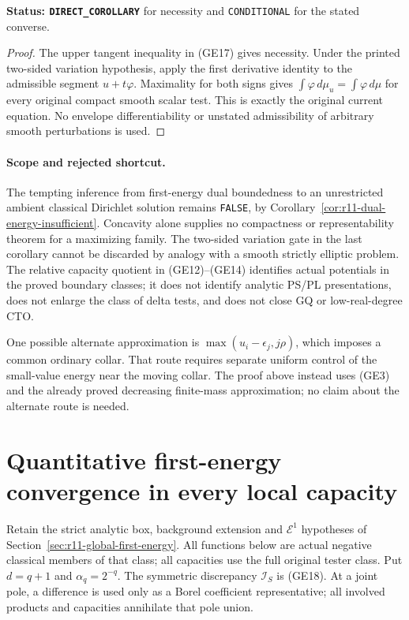 \documentclass[11pt,a4paper]{article}
\numberwithin{equation}{section}
\theoremstyle{definition}
\theoremstyle{remark}
\begin{document}
\noindent\textbf{Status: \texttt{DIRECT\_COROLLARY}} for
necessity and \texttt{CONDITIONAL} for the stated converse.

\begin{proof}
The upper tangent inequality in (GE17) gives necessity.
Under the printed two-sided variation hypothesis, apply
the first derivative identity to the admissible segment
$u+t\varphi$. Maximality for both signs gives
$\int\varphi\,d\mu_u=\int\varphi\,d\mu$ for every
original compact smooth scalar test. This is exactly the
original current equation. No envelope differentiability or
unstated admissibility of arbitrary smooth perturbations is
used.
\end{proof}

\paragraph{Scope and rejected shortcut.}
The tempting inference from first-energy dual boundedness to
an unrestricted ambient classical Dirichlet solution remains
\texttt{FALSE}, by Corollary~\ref{cor:r11-dual-energy-insufficient}.
Concavity alone supplies no compactness or representability
theorem for a maximizing family. The two-sided variation gate
in the last corollary cannot be discarded by analogy with a
smooth strictly elliptic problem. The relative capacity quotient
in (GE12)--(GE14) identifies actual potentials in the proved
boundary classes; it does not identify analytic PS/PL
presentations, does not enlarge the class of delta tests, and
does not close GQ or low-real-degree CTO.

One possible alternate approximation is
$\max(u_i-\epsilon_j,j\rho)$, which imposes a common ordinary
collar. That route requires separate uniform control of the
small-value energy near the moving collar. The proof above
instead uses (GE3) and the already proved decreasing finite-mass
approximation; no claim about the alternate route is needed.



\section{Quantitative first-energy convergence in every local capacity}
\label{sec:r11-first-energy-capacity-topology}

Retain the strict analytic box, background extension and
$\mathcal E^1$ hypotheses of
Section~\ref{sec:r11-global-first-energy}.
All functions below are actual negative classical members
of that class; all capacities use the full original tester
class. Put $d=q+1$ and $\alpha_q=2^{-q}$.
The symmetric discrepancy $\mathscr I_S$ is (GE18).
At a joint pole, a difference is used only as a Borel
coefficient representative; all involved products and
capacities annihilate that pole union.
\end{document}
